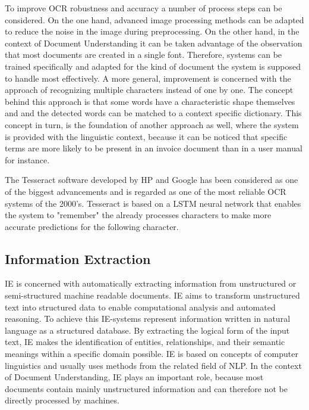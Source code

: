 To improve \ac{OCR} robustness and accuracy a number of process steps can be considered. On the one hand, advanced image processing methods can be adapted to reduce the noise in the image during preprocessing. On the other hand, in the context of Document Understanding it can be taken advantage of the observation that most documents are created in a single font. Therefore, systems can be trained specifically and adapted for the kind of document the system is supposed to handle most effectively.
A more general, improvement is concerned with the approach of recognizing multiple characters instead of one by one. The concept behind this approach is that some words have a characteristic shape themselves and and the detected words can be matched to a context specific dictionary. This concept in turn, is the foundation of another approach as well, where the system is provided with the linguistic context, because it can be noticed that specific terms are more likely to be present in an invoice document than in a user manual for instance. \cite{nagy1999optical,baird2004robust}

The Tesseract software developed by HP and Google has been considered as one of the biggest advancements and is regarded as one of the most reliable \ac{OCR} systems of the 2000's. Tesseract is based on a \ac{LSTM} neural network that enables the system to "remember" the already processes characters to make more accurate predictions for the following character. \cite{Tesseract}

\subsection{Information Extraction}
\ac{IE} is concerned with automatically extracting information from unstructured or semi-structured machine readable documents. \ac{IE} aims to transform unstructured text into structured data to enable computational analysis and automated reasoning. To achieve this \ac{IE}-systems represent information written in natural language as a structured database. By extracting the logical form of the input text, \ac{IE} makes the identification of entities, relationships, and their semantic meanings within a specific domain possible. \ac{IE} is based on concepts of computer linguistics and usually uses methods from the related field of \acl{NLP}. In the context of Document Understanding, \ac{IE} plays an important role, because most documents contain mainly unstructured information and can therefore not be directly processed by machines. \cite{hobbs2010information,church1995commercial}

